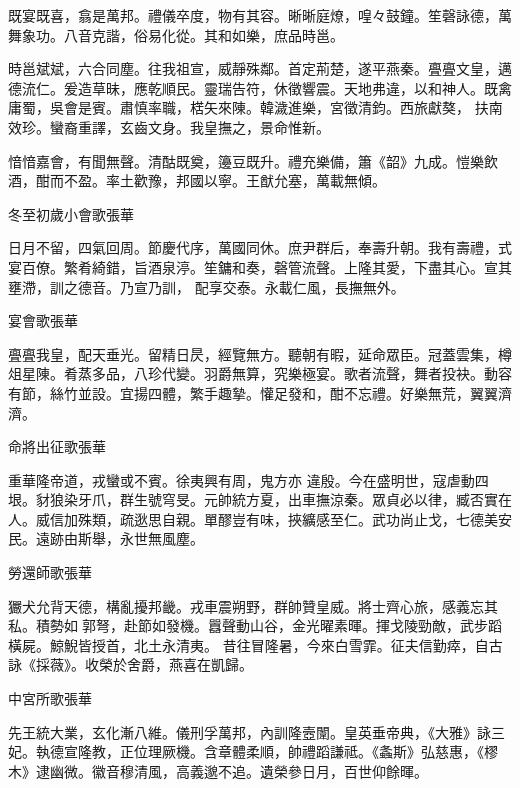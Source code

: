 \begin{pinyinscope}
 既宴既喜，翕是萬邦。禮儀卒度，物有其容。晰晰庭燎，喤々鼓鐘。笙磬詠德，萬舞象功。八音克諧，俗易化從。其和如樂，庶品時邕。



 時邕斌斌，六合同塵。往我祖宣，威靜殊鄰。首定荊楚，遂平燕秦。亹亹文皇，邁德流仁。爰造草昧，應乾順民。靈瑞告符，休徵響震。天地弗違，以和神人。既禽庸蜀，吳會是賓。肅慎率職，楛矢來陳。韓濊進樂，宮徵清鈞。西旅獻獒，
 扶南效珍。蠻裔重譯，玄齒文身。我皇撫之，景命惟新。



 愔愔嘉會，有聞無聲。清酤既奠，籩豆既升。禮充樂備，簫《韶》九成。愷樂飲酒，酣而不盈。率土歡豫，邦國以寧。王猷允塞，萬載無傾。



 冬至初歲小會歌張華



 日月不留，四氣回周。節慶代序，萬國同休。庶尹群后，奉壽升朝。我有壽禮，式宴百僚。繁肴綺錯，旨酒泉渟。笙鏞和奏，磬管流聲。上隆其愛，下盡其心。宣其壅滯，訓之德音。乃宣乃訓，
 配享交泰。永載仁風，長撫無外。



 宴會歌張華



 亹亹我皇，配天垂光。留精日昃，經覽無方。聽朝有暇，延命眾臣。冠蓋雲集，樽俎星陳。肴蒸多品，八珍代變。羽爵無算，究樂極宴。歌者流聲，舞者投袂。動容有節，絲竹並設。宜揚四體，繁手趣摯。懽足發和，酣不忘禮。好樂無荒，翼翼濟濟。



 命將出征歌張華



 重華隆帝道，戎蠻或不賓。徐夷興有周，鬼方亦
 違殷。今在盛明世，寇虐動四垠。豺狼染牙爪，群生號穹旻。元帥統方夏，出車撫涼秦。眾貞必以律，臧否實在人。威信加殊類，疏逖思自親。單醪豈有味，挾纊感至仁。武功尚止戈，七德美安民。遠跡由斯舉，永世無風塵。



 勞還師歌張華



 玁犬允背天德，構亂擾邦畿。戎車震朔野，群帥贊皇威。將士齊心旅，感義忘其私。積勢如郭弩，赴節如發機。囂聲動山谷，金光曜素暉。揮戈陵勁敵，武步蹈橫屍。鯨鯢皆授首，北土永清夷。
 昔往冒隆暑，今來白雪霏。征夫信勤瘁，自古詠《採薇》。收榮於舍爵，燕喜在凱歸。



 中宮所歌張華



 先王統大業，玄化漸八維。儀刑孚萬邦，內訓隆壼闈。皇英垂帝典，《大雅》詠三妃。執德宣隆教，正位理厥機。含章體柔順，帥禮蹈謙祗。《螽斯》弘慈惠，《樛木》逮幽微。徽音穆清風，高義邈不追。遺榮參日月，百世仰餘暉。




\end{pinyinscope}
